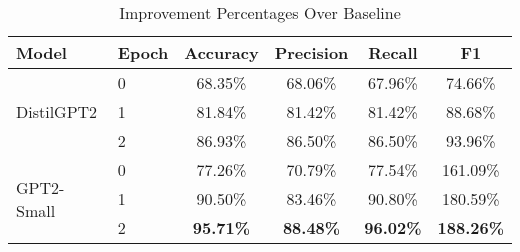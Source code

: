 \documentclass[11pt]{article}
\begin{document}
\begin{table}[htbp]
\centering
\caption{Improvement Percentages Over Baseline}
\label{tab:improvement-comparison}
\begin{tabular}{llcccc}
\toprule
\textbf{Model} & \textbf{Epoch} & \textbf{Accuracy} & \textbf{Precision} & \textbf{Recall} & \textbf{F1} \\
\midrule
\multirow{3}{*}{DistilGPT2} & 0 & 68.35\% & 68.06\% & 67.96\% & 74.66\% \\
 & 1 & 81.84\% & 81.42\% & 81.42\% & 88.68\% \\
 & 2 & 86.93\% & 86.50\% & 86.50\% & 93.96\% \\
\midrule
\multirow{3}{*}{GPT2-Small} & 0 & 77.26\% & 70.79\% & 77.54\% & 161.09\% \\
 & 1 & 90.50\% & 83.46\% & 90.80\% & 180.59\% \\
 & 2 & \textbf{95.71\%} & \textbf{88.48\%} & \textbf{96.02\%} & \textbf{188.26\%} \\
\bottomrule
\end{tabular}
\end{table}
\end{document}
